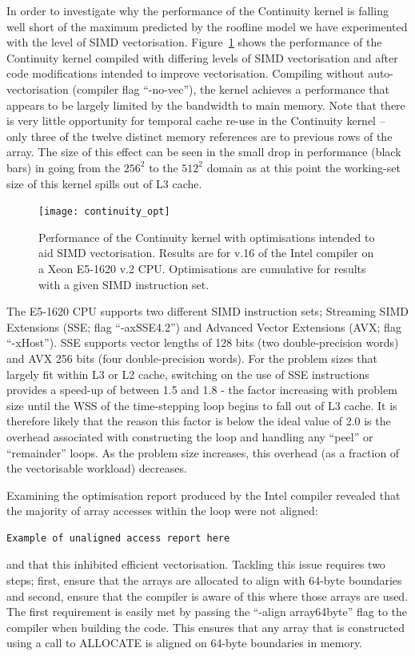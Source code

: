 \documentclass[12pt]{article}
\begin{document}
In order to investigate why the performance of the Continuity kernel
is falling well short of the maximum predicted by the roofline model
we have experimented with the level of SIMD
vectorisation. Figure~\ref{FIG_cont_vec} shows the performance of the
Continuity kernel compiled with differing levels of SIMD vectorisation
and after code modifications intended to improve vectorisation.
Compiling without auto-vectorisation (compiler flag ``-no-vec''), the
kernel achieves a performance that appears to be largely limited by
the bandwidth to main memory. Note that there is very little
opportunity for temporal cache re-use in the Continuity kernel -- only
three of the twelve distinct memory references are to previous rows of
the array. The size of this effect can be seen in the small drop in
performance (black bars) in going from the $256^2$ to the $512^2$
domain as at this point the working-set size of this kernel spills out
of L3 cache.

\begin{figure}
  \centering
  \texttt{[image: continuity\_opt]}
  \caption{Performance of the Continuity kernel with optimisations
    intended to aid SIMD vectorisation. Results are for v.16 of the
    Intel compiler on a Xeon E5-1620 v.2 CPU. Optimisations are
    cumulative for results with a given SIMD instruction set.}
  \label{FIG_cont_vec}
\end{figure}

The E5-1620 CPU supports two different SIMD instruction sets;
Streaming SIMD Extensions (SSE; flag ``-axSSE4.2'') and Advanced
Vector Extensions (AVX; flag ``-xHost''). SSE supports vector lengths
of 128 bits (two double-precision words) and AVX 256 bits (four
double-precision words). For the problem sizes that largely fit within
L3 or L2 cache, switching on the use of SSE instructions provides a
speed-up of between 1.5 and 1.8 - the factor increasing with problem
size until the WSS of the time-stepping loop begins to fall out of L3
cache. It is therefore likely that the reason this factor is below the
ideal value of 2.0 is the overhead associated with constructing the
loop and handling any ``peel'' or ``remainder'' loops. As the problem
size increases, this overhead (as a fraction of the vectorisable
workload) decreases.

Examining the optimisation report produced by the Intel compiler
revealed that the majority of array accesses within the loop were not
aligned:
\begin{verbatim}
Example of unaligned access report here
\end{verbatim}
and that this inhibited efficient vectorisation. Tackling this issue
requires two steps; first, ensure that the arrays are allocated to
align with 64-byte boundaries and second, ensure that the compiler is
aware of this where those arrays are used. The first requirement is
easily met by passing the ``-align array64byte'' flag to
the compiler when building the code. This ensures that any array that
is constructed using a call to ALLOCATE is aligned on 64-byte
boundaries in memory.
\end{document}
